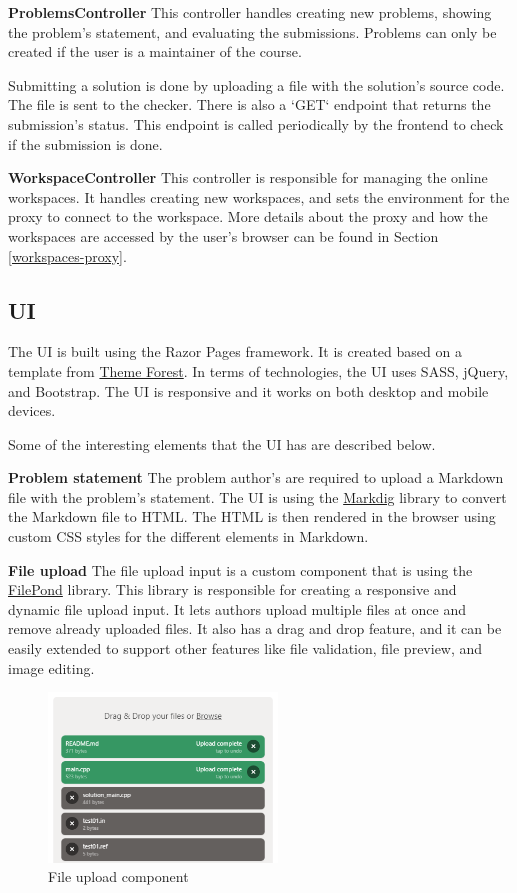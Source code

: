 \documentclass[12pt,a4paper]{report}
\begin{document}
\newpage
\textbf{ProblemsController}
This controller handles creating new problems, showing the problem's statement, and evaluating the submissions. Problems can only be created if the user is a maintainer of the course.

Submitting a solution is done by uploading a file with the solution's source code. The file is sent to the checker. There is also a `GET` endpoint that returns the submission's status. This endpoint is called periodically by the frontend to check if the submission is done.

\textbf{WorkspaceController}
This controller is responsible for managing the online workspaces. It handles creating new workspaces, and sets the environment for the proxy to connect to the workspace. More details about the proxy and how the workspaces are accessed by the user's browser can be found in Section \ref{workspaces-proxy}.

\subsection{UI}
The UI is built using the Razor Pages framework. It is created based on a template from \href{https://themeforest.net/}{Theme Forest}.
In terms of technologies, the UI uses SASS, jQuery, and Bootstrap. The UI is responsive and it works on both desktop and mobile devices.

Some of the interesting elements that the UI has are described below.

\textbf{Problem statement}
The problem author's are required to upload a Markdown file with the problem's statement. The UI is using the \href{https://github.com/xoofx/markdig}{Markdig} library to convert the Markdown file to HTML. The HTML is then rendered in the browser using custom CSS styles for the different elements in Markdown.

\textbf{File upload}
The file upload input is a custom component that is using the \href{https://pqina.nl/filepond/}{FilePond} library. This library is responsible for creating a responsive and dynamic file upload input. It lets authors upload multiple files at once and remove already uploaded files. It also has a drag and drop feature, and it can be easily extended to support other features like file validation, file preview, and image editing. 

\begin{figure}[h]
	\centering
	\includegraphics[width=230px]{./pics/file-uploader.png}
	\caption{File upload component}
	\label{fig:file-upload}
\end{figure}
\end{document}
